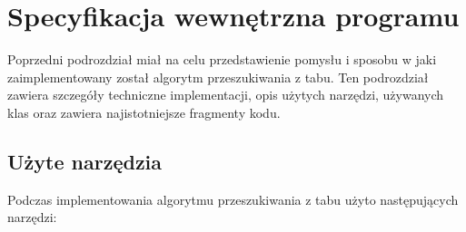 \section{Specyfikacja wewnętrzna programu}

Poprzedni podrozdział miał na celu przedstawienie pomysłu i sposobu w jaki zaimplementowany został algorytm przeszukiwania z tabu. Ten podrozdział zawiera szczegóły techniczne implementacji, opis użytych narzędzi, używanych klas oraz zawiera najistotniejsze fragmenty kodu.

\subsection{Użyte narzędzia}

Podczas implementowania algorytmu przeszukiwania z tabu użyto następujących narzędzi:


